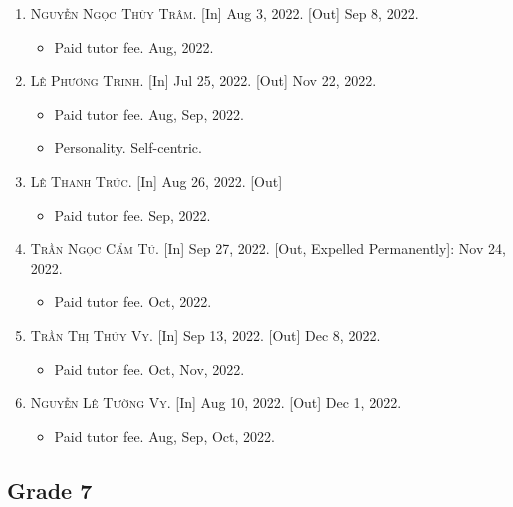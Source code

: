 \documentclass{article}
\numberwithin{equation}{section}
\begin{document}
\begin{enumerate}
	\item \textsc{Nguyễn Ngọc Thùy Trâm.} \textsf{[In]} Aug 3, 2022. \textsf{[Out]} Sep 8, 2022.
	\begin{itemize}
		\item \textsf{Paid tutor fee.} Aug, 2022.
	\end{itemize}
	\item \textsc{Lê Phương Trinh.} \textsf{[In]} Jul 25, 2022. \textsf{[Out]} Nov 22, 2022.
	\begin{itemize}
		\item \textsf{Paid tutor fee.} Aug, Sep, 2022.
		\item \textsf{Personality.} Self-centric.
	\end{itemize}
	\item \textsc{Lê Thanh Trúc.} \textsf{[In]} Aug 26, 2022. \textsf{[Out]}
	\begin{itemize}
		\item \textsf{Paid tutor fee.} Sep, 2022.
	\end{itemize}
	\item \textsc{Trần Ngọc Cẩm Tú.} \textsf{[In]} Sep 27, 2022. \textsf{[Out, Expelled Permanently]}: Nov 24, 2022.
	\begin{itemize}
		\item \textsf{Paid tutor fee.} Oct, 2022.
	\end{itemize}
	\item \textsc{Trần Thị Thúy Vy.} \textsf{[In]} Sep 13, 2022. \textsf{[Out]} Dec 8, 2022.
	\begin{itemize}
		\item \textsf{Paid tutor fee.} Oct, Nov, 2022.
	\end{itemize}
	\item \textsc{Nguyễn Lê Tường Vy.} \textsf{[In]} Aug 10, 2022. \textsf{[Out]} Dec 1, 2022.
	\begin{itemize}
		\item \textsf{Paid tutor fee.} Aug, Sep, Oct, 2022.
	\end{itemize}
\end{enumerate}

\subsection{Grade 7}
\end{document}
